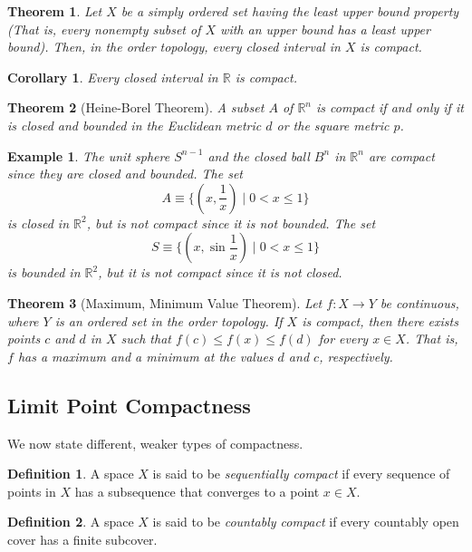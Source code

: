 \documentclass{article}
\newtheorem{theorem}{Theorem}[section]
\newtheorem{example}{Example}[section]
\newtheorem{corollary}{Corollary}[theorem]
\theoremstyle{remark}
\theoremstyle{definition}
\newtheorem{definition}{Definition}[section]
\begin{document}
\begin{theorem}
Let $X$ be a simply ordered set having the least upper bound property (That is, every nonempty subset of $X$ with an upper bound has a least upper bound). Then, in the order topology, every closed interval in $X$ is compact. 
\end{theorem}

\begin{corollary}
Every closed interval in $\mathbb{R}$ is compact. 
\end{corollary}

\begin{theorem}[Heine-Borel Theorem]
A subset $A$ of $\mathbb{R}^n$ is compact if and only if it is closed and bounded in the Euclidean metric $d$ or the square metric $p$. 
\end{theorem}

\begin{example}
The unit sphere $S^{n-1}$ and the closed ball $B^n$ in $\mathbb{R}^n$ are compact since they are closed and bounded. The set
\[A \equiv \{(x, \frac{1}{x}) \; | \; 0 < x \leq 1\}\]
is closed in $\mathbb{R}^2$, but is not compact since it is not bounded. The set 
\[S \equiv \{(x, \sin{\frac{1}{x}}) \; | \; 0<x\leq 1\}\]
is bounded in $\mathbb{R}^2$, but it is not compact since it is not closed. 
\end{example}

\begin{theorem}[Maximum, Minimum Value Theorem]
Let $f: X \longrightarrow Y$ be continuous, where $Y$ is an ordered set in the order topology. If $X$ is compact, then there exists points $c$ and $d$ in $X$ such that $f(c) \leq f(x) \leq f(d)$ for every $x \in X$. That is, $f$ has a maximum and a minimum at the values $d$ and $c$, respectively. 
\end{theorem}

\subsection{Limit Point Compactness}
We now state different, weaker types of compactness. 

\begin{definition}
A space $X$ is said to be \textit{sequentially compact} if every sequence of points in $X$ has a subsequence that converges to a point $x \in X$. 
\end{definition}

\begin{definition}
A space $X$ is said to be \textit{countably compact} if every countably open cover has a finite subcover. 
\end{definition}
\end{document}
